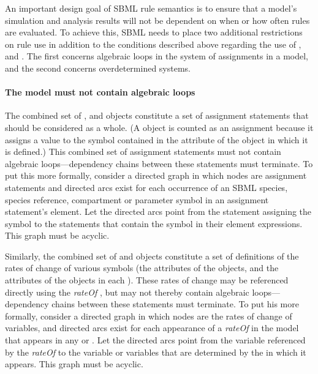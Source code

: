 An important design goal of SBML rule semantics is to ensure that
a model's simulation and analysis results will not be dependent on
when or how often rules are evaluated.  To achieve this, SBML
needs to place two additional restrictions on rule use in addition
to the conditions described above regarding the use of
\AlgebraicRule, \AssignmentRule and \RateRule.  The first concerns
algebraic loops in the system of assignments in a model, and the
second concerns overdetermined systems.


\paragraph{The model must not contain algebraic loops}

The combined set of \InitialAssignment, \AssignmentRule and
\KineticLaw objects constitute a set of assignment statements that
should be considered as a whole.  (A \KineticLaw object is counted
as an assignment because it assigns a value to the symbol
contained in the  attribute of the \Reaction object in which
it is defined.)  This combined set of assignment statements must
not contain algebraic loops---dependency chains between these
statements must terminate.  To put this more formally, consider a
directed graph in which nodes are assignment statements and
directed arcs exist for each occurrence of an SBML species, species reference,
compartment or parameter symbol in an assignment statement's
 element.  Let the directed arcs point from the
statement assigning the symbol to the statements that contain the
symbol in their  element expressions.  This graph must
be acyclic.

\begin{blockChanged}
Similarly, the combined set of \RateRule and \Reaction objects constitute a set of definitions of the rates of change of various symbols (the  attributes of the \RateRule objects, and the  attributes of the \SpeciesReference objects in each \Reaction).  These rates of change may be referenced directly using the \emph{rateOf} , but may not thereby contain algebraic loops---dependency chains between these statements must terminate.  To put his more formally, consider a directed graph in which nodes are the rates of change of variables, and directed arcs exist for each appearance of a \emph{rateOf}  in the model that appears in any \RateRule or \KineticLaw.  Let the directed arcs point from the variable referenced by the \emph{rateOf}  to the variable or variables that are determined by the \Math in which it appears.  This graph must be acyclic.
\end{blockChanged}

